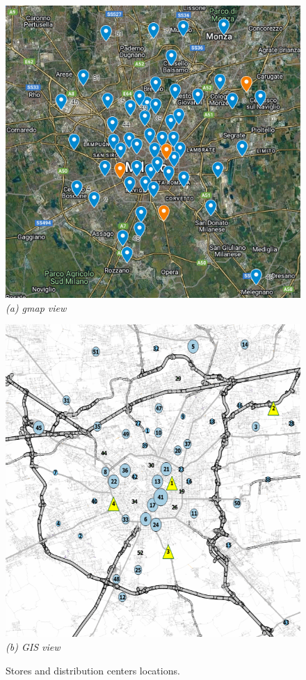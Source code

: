 \documentclass[ijoc,sglanonrev]{informs4}
\begin{document}
\begin{figure}[ht]
\centering
\begin{minipage}{0.48\textwidth}
    \centering
    \includegraphics[width=\linewidth]{gmap.png}
    \vspace{0.5em}
    \textit{(a) gmap view}
\end{minipage}
\hfill
\begin{minipage}{0.48\textwidth}
    \centering
    \includegraphics[width=\linewidth]{qgis.png}
    \vspace{0.5em}
    \textit{(b) GIS view}
\end{minipage}
\caption{Stores and distribution centers locations.}
\label{fig:locations}
\end{figure}
\end{document}
